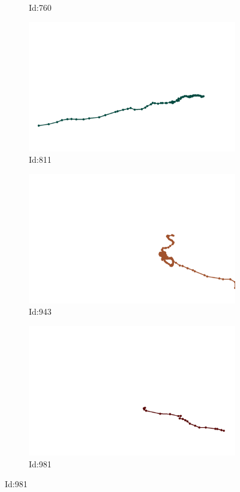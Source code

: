 \documentclass[12pt,twoside]{report}
\begin{document}
\begin{figure}
\begin{subfigure}[b]{0.20\textwidth}
\caption{Id:760}
\end{subfigure}
\begin{subfigure}[b]{0.20\textwidth}
\centering
\includegraphics[width=\textwidth]{../../trajectories/811.png}
\caption{Id:811}
\end{subfigure}
\begin{subfigure}[b]{0.20\textwidth}
\centering
\includegraphics[width=\textwidth]{../../trajectories/943.png}
\caption{Id:943}
\end{subfigure}
\begin{subfigure}[b]{0.20\textwidth}
\centering
\includegraphics[width=\textwidth]{../../trajectories/981.png}
\caption{Id:981}
\end{subfigure}
\end{figure}
\end{document}
